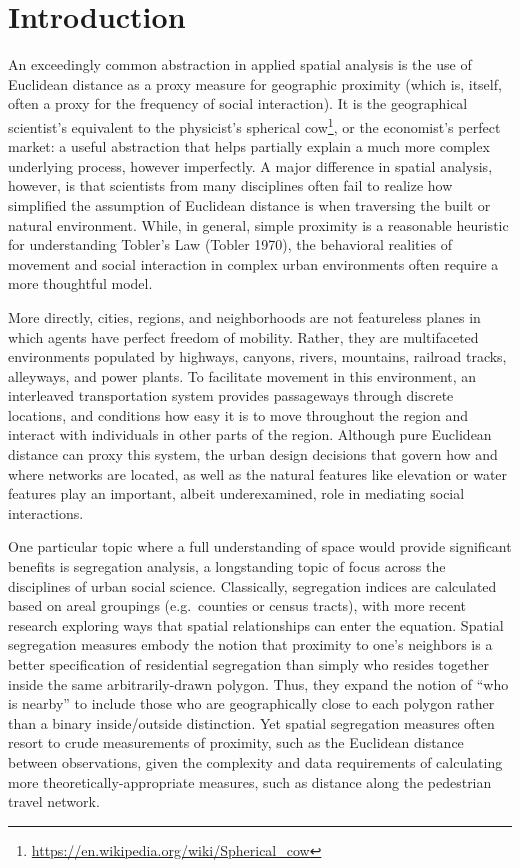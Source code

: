 \documentclass[
  10pt,
]{article}
\begin{document}
\setlength{\parindent}{16pt}
\setlength{\parskip}{0pt}

\hypertarget{introduction}{%
\section{Introduction}\label{introduction}}

An exceedingly common abstraction in applied spatial analysis is the use
of Euclidean distance as a proxy measure for geographic proximity (which
is, itself, often a proxy for the frequency of social interaction). It
is the geographical scientist's equivalent to the physicist's spherical
cow\footnote{\url{https://en.wikipedia.org/wiki/Spherical_cow}}, or the
economist's perfect market: a useful abstraction that helps partially
explain a much more complex underlying process, however imperfectly. A
major difference in spatial analysis, however, is that scientists from
many disciplines often fail to realize how simplified the assumption of
Euclidean distance is when traversing the built or natural environment.
While, in general, simple proximity is a reasonable heuristic for
understanding Tobler's Law (Tobler 1970), the behavioral realities of
movement and social interaction in complex urban environments often
require a more thoughtful model.

More directly, cities, regions, and neighborhoods are not featureless
planes in which agents have perfect freedom of mobility. Rather, they
are multifaceted environments populated by highways, canyons, rivers,
mountains, railroad tracks, alleyways, and power plants. To facilitate
movement in this environment, an interleaved transportation system
provides passageways through discrete locations, and conditions how easy
it is to move throughout the region and interact with individuals in
other parts of the region. Although pure Euclidean distance can proxy
this system, the urban design decisions that govern how and where
networks are located, as well as the natural features like elevation or
water features play an important, albeit underexamined, role in
mediating social interactions.

One particular topic where a full understanding of space would provide
significant benefits is segregation analysis, a longstanding topic of
focus across the disciplines of urban social science. Classically,
segregation indices are calculated based on areal groupings
(e.g.~counties or census tracts), with more recent research exploring
ways that spatial relationships can enter the equation. Spatial
segregation measures embody the notion that proximity to one's neighbors
is a better specification of residential segregation than simply who
resides together inside the same arbitrarily-drawn polygon. Thus, they
expand the notion of ``who is nearby'' to include those who are
geographically close to each polygon rather than a binary inside/outside
distinction. Yet spatial segregation measures often resort to crude
measurements of proximity, such as the Euclidean distance between
observations, given the complexity and data requirements of calculating
more theoretically-appropriate measures, such as distance along the
pedestrian travel network.
\end{document}
